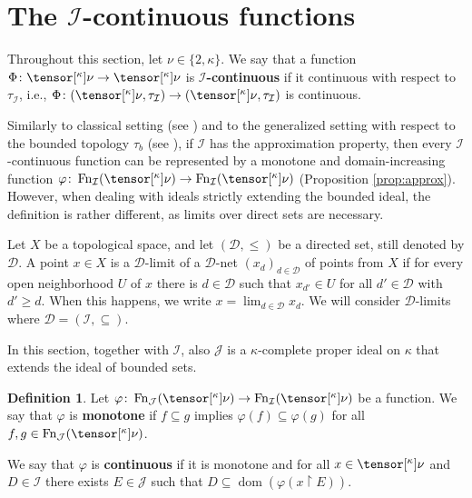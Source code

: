 \documentclass{amsart}
\numberwithin{equation}{section}
\newcommand{\D}{\mathcal{D}}
\newcommand{\I}{\mathcal{I}}
\newcommand{\J}{\mathcal{J}}
\newcommand{\pre}[2]{\tensor[^{#1}]{#2}{}}
\newcommand{\markdef}[1]{\textbf{#1}}
\newcommand{\1}{\mathbf{I}}
\newcommand{\2}{\mathbf{II}}
\renewcommand{\k}{\kappa}
\DeclareMathOperator{\dom}{dom}
\DeclareMathOperator{\Fn}{Fn}
\theoremstyle{definition}
\newtheorem{definition}[theorem]{Definition}
\theoremstyle{remark}
\begin{document}
\section{The \(\I\)-continuous functions}
\label{sec:continuous}

Throughout this section, let \(\nu \in \{2,\k\}\). 
We say that a function \(\Phi \colon \pre{\k}{\nu} \to \pre{\k}{\nu}\) is \markdef{\(\I\)-continuous} if it continuous with respect to \(\tau_\I\), i.e., \(\Phi \colon (\pre{\k}{\nu}, \tau_\I) \to (\pre{\k}{\nu}, \tau_\I)\) is continuous. 

Similarly to classical setting (see \cite[Proposition 2.6]{Kech}) and to the generalized setting with respect to the bounded topology \(\tau_{b}\) (see \cite[Definition 3.6]{AMR}), if \(\I\) has the approximation property, then every \(\I\)-continuous function can be represented by a monotone and domain-increasing function  $\varphi \colon \Fn_\I( \pre{\k}{\nu} ) \to \Fn_\I( \pre{\k}{\nu} ) $ (Proposition \ref{prop:approx}). However, when dealing with ideals strictly extending the bounded ideal, the definition is rather different, as limits over direct sets are necessary. 




Let \( X \) be a topological space, and let \( (\D,\leq) \) be a directed set, still denoted by \( \D \). A point \( x \in X  \) is a \( \D \)-limit of a \( \D \)-net \( (x_d)_{d \in \D} \) of points from \( X \) if for every open neighborhood \( U \) of \( x \) there is \( d \in \D \) such that \( x_{d'} \in U \) for all \( d' \in \D \) with \( d' \geq d\). When this happens, we write \( x = \lim_{d \in \D} x_d\). 
We will consider \( \D \)-limits where \(\D=(\I, \subseteq)\).

In this section, together with $\I$, also $\J$ is a ${}\kappa$-complete proper ideal on $\kappa$ that extends the ideal of bounded sets.

\begin{definition}\label{def_functions} 
Let  $\varphi \colon \Fn_\J( \pre{\k}{\nu} ) \to \Fn_\I( \pre{\k}{\nu} ) $ be a function. 
We say that $\varphi$ is 
\markdef{monotone} if $ f \subseteq g $ implies $\varphi(f) \subseteq \varphi(g)$ for all $f, g \in \Fn_\J( \pre{\k}{\nu} )$.

We say that $\varphi$ is  \markdef{continuous} if it is monotone and for all $x \in \pre{\k}{\nu} $ and \(D\in \I\) there exists \(E \in \J\) such that \(D \subseteq \dom(\varphi(x \restriction E))\).
\end{definition}
\end{document}
